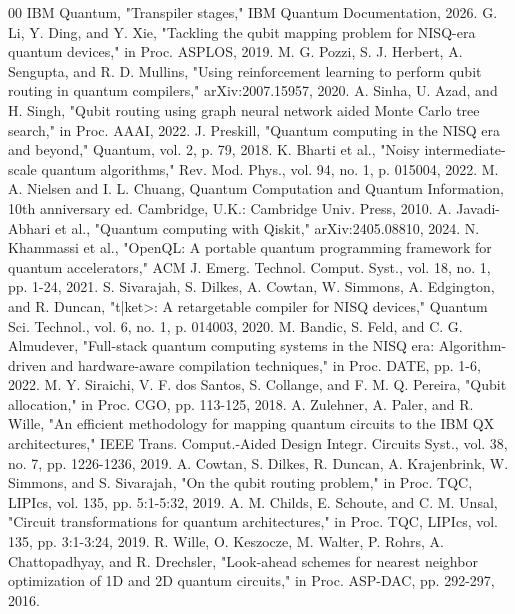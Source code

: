 \documentclass[conference]{IEEEtran}
\begin{document}
\begin{thebibliography}{00}
 IBM Quantum, "Transpiler stages," IBM Quantum Documentation, 2026.
 G. Li, Y. Ding, and Y. Xie, "Tackling the qubit mapping problem for NISQ-era quantum devices," in Proc. ASPLOS, 2019.
 M. G. Pozzi, S. J. Herbert, A. Sengupta, and R. D. Mullins, "Using reinforcement learning to perform qubit routing in quantum compilers," arXiv:2007.15957, 2020.
 A. Sinha, U. Azad, and H. Singh, "Qubit routing using graph neural network aided Monte Carlo tree search," in Proc. AAAI, 2022.
 J. Preskill, "Quantum computing in the NISQ era and beyond," Quantum, vol. 2, p. 79, 2018.
 K. Bharti et al., "Noisy intermediate-scale quantum algorithms," Rev. Mod. Phys., vol. 94, no. 1, p. 015004, 2022.
 M. A. Nielsen and I. L. Chuang, Quantum Computation and Quantum Information, 10th anniversary ed. Cambridge, U.K.: Cambridge Univ. Press, 2010.
 A. Javadi-Abhari et al., "Quantum computing with Qiskit," arXiv:2405.08810, 2024.
 N. Khammassi et al., "OpenQL: A portable quantum programming framework for quantum accelerators," ACM J. Emerg. Technol. Comput. Syst., vol. 18, no. 1, pp. 1-24, 2021.
 S. Sivarajah, S. Dilkes, A. Cowtan, W. Simmons, A. Edgington, and R. Duncan, "t|ket>: A retargetable compiler for NISQ devices," Quantum Sci. Technol., vol. 6, no. 1, p. 014003, 2020.
 M. Bandic, S. Feld, and C. G. Almudever, "Full-stack quantum computing systems in the NISQ era: Algorithm-driven and hardware-aware compilation techniques," in Proc. DATE, pp. 1-6, 2022.
 M. Y. Siraichi, V. F. dos Santos, S. Collange, and F. M. Q. Pereira, "Qubit allocation," in Proc. CGO, pp. 113-125, 2018.
 A. Zulehner, A. Paler, and R. Wille, "An efficient methodology for mapping quantum circuits to the IBM QX architectures," IEEE Trans. Comput.-Aided Design Integr. Circuits Syst., vol. 38, no. 7, pp. 1226-1236, 2019.
 A. Cowtan, S. Dilkes, R. Duncan, A. Krajenbrink, W. Simmons, and S. Sivarajah, "On the qubit routing problem," in Proc. TQC, LIPIcs, vol. 135, pp. 5:1-5:32, 2019.
 A. M. Childs, E. Schoute, and C. M. Unsal, "Circuit transformations for quantum architectures," in Proc. TQC, LIPIcs, vol. 135, pp. 3:1-3:24, 2019.
 R. Wille, O. Keszocze, M. Walter, P. Rohrs, A. Chattopadhyay, and R. Drechsler, "Look-ahead schemes for nearest neighbor optimization of 1D and 2D quantum circuits," in Proc. ASP-DAC, pp. 292-297, 2016.

\end{thebibliography}
\end{document}
